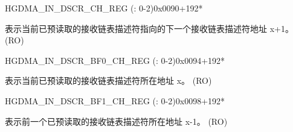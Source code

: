 \begin{register}{H}{GDMA\_IN\_DSCR\_CH\_REG (: 0-2)}{0x0090+192*}\label{regdesc:GDMAINDSCRCHNREG}
%
\regnewline%
\begin{regdesc}\begin{reglist}
\label{fielddesc:GDMAINLINKDSCRCHN}\item [GDMA\_INLINK\_DSCR\_CH\regindex{n}] 表示当前已预读取的接收链表描述符指向的下一个接收链表描述符地址 x+1。 (RO)
\end{reglist}\end{regdesc}
\end{register}


\begin{register}{H}{GDMA\_IN\_DSCR\_BF0\_CH\_REG (: 0-2)}{0x0094+192*}\label{regdesc:GDMAINDSCRBF0CHNREG}
%
\regnewline%
\begin{regdesc}\begin{reglist}
\label{fielddesc:GDMAINLINKDSCRBF0CHN}\item [GDMA\_INLINK\_DSCR\_BF0\_CH\regindex{n}] 表示当前已预读取的接收链表描述符所在地址 x。 (RO)
\end{reglist}\end{regdesc}
\end{register}


\begin{register}{H}{GDMA\_IN\_DSCR\_BF1\_CH\_REG (: 0-2)}{0x0098+192*}\label{regdesc:GDMAINDSCRBF1CHNREG}
%
\regnewline%
\begin{regdesc}\begin{reglist}
\label{fielddesc:GDMAINLINKDSCRBF1CHN}\item [GDMA\_INLINK\_DSCR\_BF1\_CH\regindex{n}] 表示前一个已预读取的接收链表描述符所在地址 x-1。 (RO)
\end{reglist}\end{regdesc}
\end{register}


